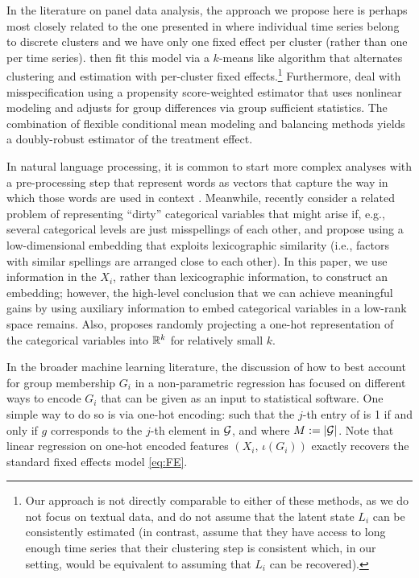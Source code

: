 \documentclass{article}
\theoremstyle{plain}
\theoremstyle{definition}
\theoremstyle{remark}
\begin{document}
In the literature on panel data analysis, the approach we propose here is perhaps most closely related to the one presented in \citet{bonhomme2015grouped} where individual time series belong to discrete clusters and we have only one fixed effect per cluster (rather than one per time series). \citet{bonhomme2015grouped} then fit this model via a $k$-means like algorithm that alternates clustering and estimation with per-cluster fixed
effects.\footnote{Our approach is not directly comparable to either of these methods, as we do not focus on textual data, and do not assume that the latent state $L_i$ can be consistently estimated (in contrast, \citet{bonhomme2015grouped} assume that they have access to long enough time series that their clustering step is consistent which, in our setting, would be equivalent to assuming that $L_i$ can be recovered).} Furthermore, \cite{arkhangelsky2018role} deal with misspecification using a propensity score-weighted estimator that uses nonlinear modeling and adjusts for group differences via group sufficient statistics. The combination of flexible conditional mean modeling and balancing methods yields a doubly-robust estimator of the treatment effect.

In natural language processing, it is common
to start more complex analyses with a pre-processing step that represent words as vectors that capture
the way in which those words are used in context \citep{mikolov2013efficient,pennington2014glove}.
Meanwhile, \citet{cerda2018similarity} recently consider a related problem of representing ``dirty'' categorical
variables that might arise if, e.g., several categorical levels are just misspellings of each other, and
propose using a low-dimensional embedding that exploits lexicographic similarity (i.e., factors with
similar spellings are arranged close to each other). In this paper, we use information in the $X_i$,
rather than lexicographic information, to construct an embedding; however, the high-level conclusion
that we can achieve meaningful gains by using auxiliary information to embed categorical variables in
a low-rank space remains. Also, \citep{rahimi2008random} proposes randomly projecting a one-hot
representation of the categorical variables into $\mathbb{R}^k$ for relatively small $k$.


In the broader machine learning literature, the discussion of how to best account for group membership $G_i$ in a non-parametric regression
has focused on different ways to encode $G_i$ that can be given as an input to
statistical software. One simple way to do so is via one-hot encoding:
 such that the $j$-th entry of 
is 1 if and only if $g$ corresponds to the $j$-th element in $\mathcal{G}$, and where $M := {\left\lvert\mathcal{G}\right\rvert}$. Note that linear regression on
one-hot encoded features $(X_i, \, \iota(G_i))$ exactly recovers the standard fixed effects model
\eqref{eq:FE}.
\end{document}
